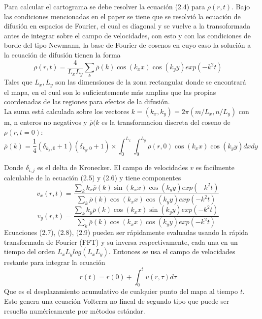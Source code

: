\documentclass[20pt]{report}
\begin{document}
\begin{itemize}
Para calcular el cartograma  se debe resolver la ecuaci\'on (2.4) para $\rho(r,t)$. Bajo las condiciones  mencionadas en el paper se tiene que se resolvi\'o la ecuaci\'on de difusi\'on en  espacios de Fourier,  el cual es diagonal y se vuelve a la transoformada antes de integrar sobre el campo de velocidades, con esto y  con las condiciones de borde del tipo  Newmann, la base de Fourier  de cosenos  en cuyo caso la soluci\'on a la ecuaci\'on de difusi\'on tienen la forma
\begin{equation}
\rho (r,t)= \dfrac{4}{L_x L_y} \sum_k {\overline{\rho}} (k) \cos(k_x x) \cos(k_y y)exp(-k^2 t)
\end{equation}
Tales que $L_x,L_y$ son las dimensiones de la zona rectangular  donde se encontrar\'a el mapa, en el cual son  lo suficientemente m\'as amplias que las propias coordenadas de las regiones para efectos de la difusi\'on. \\
La suma est\'a calculada sobre los vectores $k=(k_x,k_y)=2 \pi (m/L_x, n/L_y)$ con m, n enteros no negativos y $\overline{\rho}(k$ es la transformacion discreta del coseno de $\rho (r, t=0)$:
\begin{equation}
\overline{\rho}(k)=\dfrac{1}{4}(\delta_{k_x,0}+1)(\delta_{k_y,0}+1)\times \int_0^{L_x} \int_0^{L_y} \rho (r,0)\cos(k_x x)\cos(k_y y) dx dy
\end{equation}


\pagebreak
Donde $\delta_{i,j}$ es el delta de Kronecker. El campo de velocidades $v$ es facilmente calculable de la ecuaci\'on (2.5) y (2.6)  y tiene componentes
\begin{equation}
v_x(r,t)=\dfrac{\sum_k {k_x\overline{\rho}} (k) \sin(k_x x) \cos(k_y y)exp(-k^2 t)}{\sum_k {\overline{\rho}} (k) \cos(k_x x) \cos(k_y y)exp(-k^2 t)}
\end{equation}
\begin{equation}
v_y(r,t)=\dfrac{\sum_k {k_y\overline{\rho}} (k) \cos(k_x x) \sin(k_y y)exp(-k^2 t)}{\sum_k {\overline{\rho}} (k) \cos(k_x x) \cos(k_y y)exp(-k^2 t)}
\end{equation}
Ecuaciones (2.7), (2.8), (2.9) pueden ser r\'apidamente evaluadas usando la r\'apida transformada de Fourier (FFT) y su inversa respectivamente,  cada una  en un tiempo del orden $L_x L_y log(L_x L_y)$. Entonces se usa  el campo de velocidades restante para integrar la ecuaci\'on 
\[r(t)= r(0) +\int_0^t v(r,\tau)d\tau\]
Que es el desplazamiento acumulativo de cualquier punto del mapa al tiempo $t$.
\\
Esto genera una ecuaci\'on  Volterra no lineal de segundo tipo que puede ser resuelta num\'ericamente por m\'etodos est\'andar.




\end{itemize}
\end{document}
